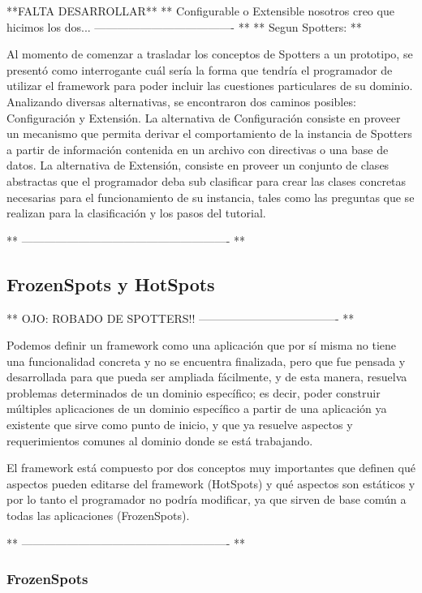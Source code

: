 **FALTA DESARROLLAR**
** Configurable o Extensible nosotros creo que hicimos los dos... ------------------------------------- **
** Segun Spotters: **

Al momento de comenzar a trasladar los conceptos de Spotters a un prototipo, se presentó  como  interrogante  cuál  sería  la  forma  que  tendría  el  programador  de  utilizar el  framework  para  poder  incluir  las  cuestiones  particulares  de  su  dominio.  Analizando diversas alternativas, se encontraron dos caminos posibles: Configuración y Extensión. 
La  alternativa  de  Configuración  consiste  en  proveer  un  mecanismo  que  permita derivar el comportamiento de la instancia de Spotters a partir de información contenida en  un  archivo  con  directivas  o  una  base  de  datos.  La  alternativa  de Extensión,  consiste en  proveer  un  conjunto  de  clases  abstractas  que  el  programador  deba  sub  clasificar para crear las clases concretas necesarias para el funcionamiento de su instancia, tales como las preguntas que se realizan para la clasificación y los pasos del tutorial.

** ------------------------------------------------------- **


\subsection{FrozenSpots y HotSpots}
** OJO: ROBADO DE SPOTTERS!! ------------------------------------- **

Podemos definir un framework como una aplicación que por sí misma no tiene una funcionalidad concreta y no se encuentra finalizada, pero que fue pensada y desarrollada para que pueda ser ampliada fácilmente, y de esta manera, resuelva problemas determinados de un dominio específico; es decir, poder construir múltiples aplicaciones de un dominio específico a partir de una aplicación ya existente que sirve como punto de inicio, y que ya resuelve aspectos y requerimientos comunes al dominio donde se está trabajando.

El framework está compuesto por dos conceptos muy importantes que definen qué aspectos pueden editarse del framework (HotSpots) y qué aspectos son estáticos y por lo tanto el programador no podría modificar, ya que sirven de base común a todas las aplicaciones (FrozenSpots).

** ------------------------------------------------------- **

\subsubsection{FrozenSpots}

